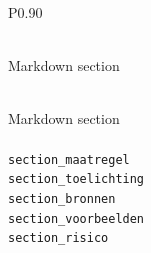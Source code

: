 \begingroup
\small
\setlength{\tabcolsep}{4pt}
\renewcommand{\arraystretch}{1.1}
\setlength{\LTcapwidth}{\textwidth}
\setlength{\LTleft}{0pt plus 1fill}
\setlength{\LTright}{0pt plus 1fill}
\begin{longtable}{P{0.90\textwidth}}
\caption{Markdown sections identified in Algoritmekader maatregelen files.} \label{tab:algoritmekader-maatregelen-section-fields} \\
\toprule
Markdown section \\
\midrule
\endfirsthead
\caption[]{Markdown sections identified in Algoritmekader maatregelen files.} \\
\toprule
Markdown section \\
\midrule
\endhead
\midrule
{} \\
\midrule
\endfoot
\bottomrule
\endlastfoot
\texttt{section\_\allowbreak{}maatregel} \\
\texttt{section\_\allowbreak{}toelichting} \\
\texttt{section\_\allowbreak{}bronnen} \\
\texttt{section\_\allowbreak{}voorbeelden} \\
\texttt{section\_\allowbreak{}risico} \\
\end{longtable}
\endgroup
